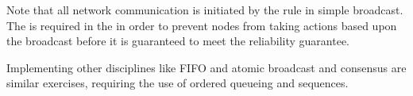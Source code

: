 Note that all network communication is initiated by the
 rule in simple broadcast.  The  is
required in the  in order to prevent nodes from
taking actions based upon the broadcast before it is guaranteed to
meet the reliability guarantee.

Implementing other disciplines like FIFO and atomic broadcast and
consensus are similar exercises, requiring the use of ordered queueing
and sequences.
